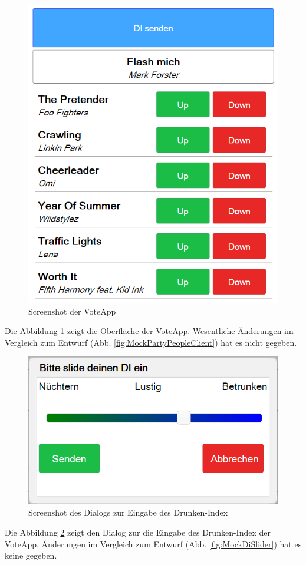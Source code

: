 \begin{figure}[H]
\centering
\includegraphics[width=0.6\linewidth]{Bilder/Screenshot-Vote-App}
\caption{Screenshot der VoteApp}
\label{fig:Screenshot-Vote-App}
\end{figure}

Die Abbildung \ref{fig:Screenshot-Vote-App} zeigt die Oberfläche der VoteApp. Wesentliche Änderungen im Vergleich zum Entwurf (Abb. \ref{fig:MockPartyPeopleClient}) hat es nicht gegeben. 

\begin{figure}[H]
\centering
\includegraphics[width=0.5\linewidth]{Bilder/Screenshot-VoteApp-DI-Slider}
\caption{Screenshot des Dialogs zur Eingabe des Drunken-Index}
\label{fig:Screenshot-Vote-App_Slider}
\end{figure}

Die Abbildung \ref{fig:Screenshot-Vote-App_Slider} zeigt den Dialog zur die Eingabe des Drunken-Index der VoteApp. Änderungen im Vergleich zum Entwurf (Abb. \ref{fig:MockDiSlider}) hat es keine gegeben.